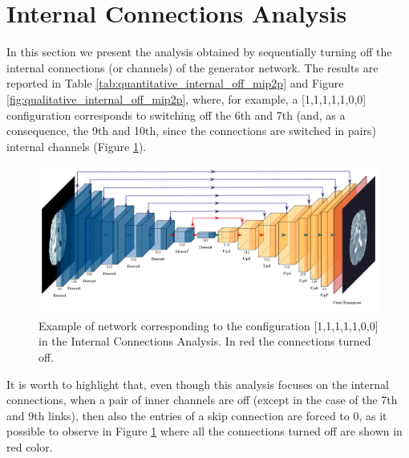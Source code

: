 \section{Internal Connections Analysis}
\label{sec:internal_analysis}
In this section we present the analysis obtained by sequentially turning off the internal connections (or channels) of the generator network. 
The results are reported in Table \ref{tab:quantitative_internal_off_mip2p} and Figure \ref{fig:qualitative_internal_off_mip2p}, where, for example, a [1,1,1,1,1,0,0] configuration corresponds to switching off the 6th and 7th (and, as a consequence, the 9th and 10th, since the connections are switched in pairs) internal channels (Figure \ref{fig:config_internal}).


\begin{figure}[H]
\centering
\includegraphics[height=0.266\textheight]{images/config_internal.pdf}
\caption[Configuration example in Internal Connections Analysis]{Example of network corresponding to the configuration [1,1,1,1,1,0,0] in the Internal Connections Analysis. In red the connections turned off.}
\label{fig:config_internal}
\end{figure}
\vspace{5mm}
It is worth to highlight that, even though this analysis focuses on the internal connections, when a pair of inner channels are off (except in the case of the 7th and 9th links), then also the entries of a skip connection are forced to 0, as it possible to observe in Figure \ref{fig:config_internal} where all the connections turned off are shown in red color.

